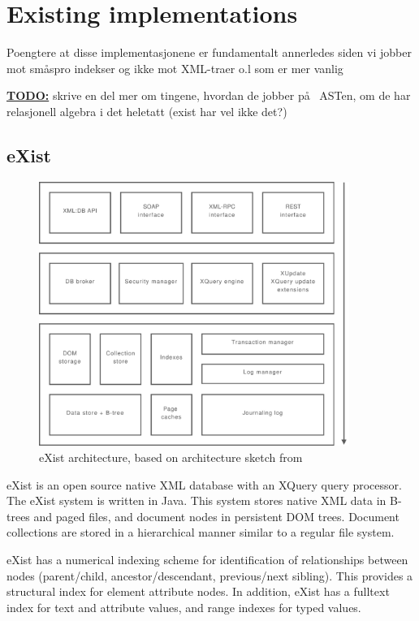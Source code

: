\section{Existing implementations}
\label{sect:existing_implementations}

Poengtere at disse implementasjonene er fundamentalt annerledes siden vi jobber
mot sm\aa spro indekser og ikke mot XML-traer o.l som er mer vanlig

\textbf{\underline{\LARGE TODO:}} skrive en del mer om tingene, hvordan de jobber p\aa~ ASTen, om de har relasjonell algebra i det heletatt (exist har vel ikke det?)

\subsection{eXist}
\begin{figure}[h]
  \centering
    \includegraphics[width=0.9\textwidth]{diagrams/exist_arch}
  \caption[eXist architecture]{eXist architecture, based on architecture sketch
  from \cite{exist_indexdriven}}
\end{figure}
eXist\cite{exist_doc} is an open source native XML database with an XQuery
query processor. The eXist system is written in Java. This system stores native
XML data in B-trees and paged files, and document nodes
in persistent DOM trees\cite{exist_factsheet}. Document collections are stored
in a hierarchical manner similar to a regular file system.

eXist has a numerical indexing scheme for identification of relationships
between nodes (parent/child, ancestor/descendant, previous/next sibling). This
provides a structural index for element attribute nodes. In addition, eXist has
a fulltext index for text and attribute values, and range indexes for typed
values.


